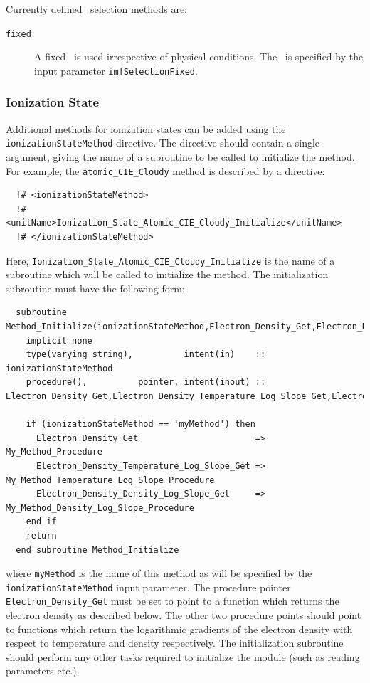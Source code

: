 Currently defined \IMF\ selection methods are:
\begin{description}
 \item [{\tt fixed}] A fixed \IMF\ is used irrespective of physical conditions. The \IMF\ is specified by the input parameter {\tt imfSelectionFixed}.
\end{description}

\subsubsection{Ionization State}\label{sec:IonizationStateMethods}

Additional methods for ionization states can be added using the {\tt ionizationStateMethod} directive. The directive should contain a single argument, giving the name of a subroutine to be called to initialize the method. For example, the {\tt atomic\_CIE\_Cloudy} method is described by a directive:
\begin{verbatim}
  !# <ionizationStateMethod>
  !#  <unitName>Ionization_State_Atomic_CIE_Cloudy_Initialize</unitName>
  !# </ionizationStateMethod>
\end{verbatim}
Here, {\tt Ionization\_State\_Atomic\_CIE\_Cloudy\_Initialize} is the name of a subroutine which will be called to initialize the method. The initialization subroutine must have the following form:
\begin{verbatim}
  subroutine Method_Initialize(ionizationStateMethod,Electron_Density_Get,Electron_Density_Temperature_Log_Slope_Get,Electron_Density_Density_Log_Slope_Get)
    implicit none
    type(varying_string),          intent(in)    :: ionizationStateMethod
    procedure(),          pointer, intent(inout) :: Electron_Density_Get,Electron_Density_Temperature_Log_Slope_Get,Electron_Density_Density_Log_Slope_Get
    
    if (ionizationStateMethod == 'myMethod') then
      Electron_Density_Get                       => My_Method_Procedure
      Electron_Density_Temperature_Log_Slope_Get => My_Method_Temperature_Log_Slope_Procedure
      Electron_Density_Density_Log_Slope_Get     => My_Method_Density_Log_Slope_Procedure
    end if
    return
  end subroutine Method_Initialize
\end{verbatim}
where {\tt myMethod} is the name of this method as will be specified by the {\tt ionizationStateMethod} input parameter. The procedure pointer {\tt Electron\_Density\_Get} must be set to point to a function which returns the electron density as described below. The other two procedure points should point to functions which return the logarithmic gradients of the electron density with respect to temperature and density respectively. The initialization subroutine should perform any other tasks required to initialize the module (such as reading parameters etc.).

